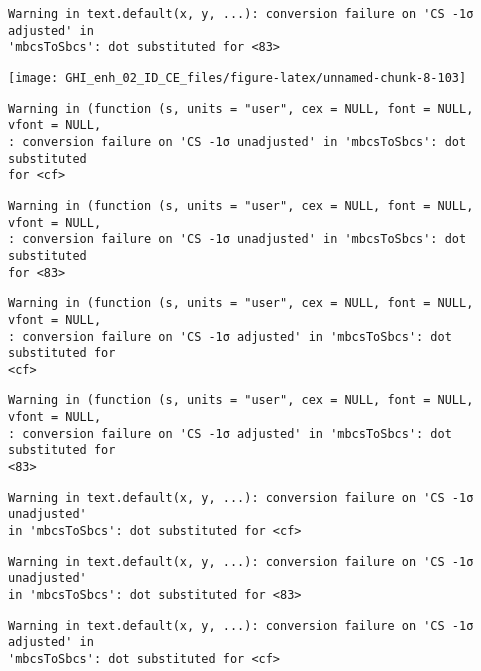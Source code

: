 \documentclass[
  10pt,
  a4paper,oneside]{article}
\begin{document}
\begin{verbatim}
Warning in text.default(x, y, ...): conversion failure on 'CS -1σ adjusted' in
'mbcsToSbcs': dot substituted for <83>
\end{verbatim}

\begin{center}\texttt{[image: GHI\_enh\_02\_ID\_CE\_files/figure-latex/unnamed-chunk-8-103]} \end{center}

\begin{verbatim}
Warning in (function (s, units = "user", cex = NULL, font = NULL, vfont = NULL,
: conversion failure on 'CS -1σ unadjusted' in 'mbcsToSbcs': dot substituted
for <cf>
\end{verbatim}

\begin{verbatim}
Warning in (function (s, units = "user", cex = NULL, font = NULL, vfont = NULL,
: conversion failure on 'CS -1σ unadjusted' in 'mbcsToSbcs': dot substituted
for <83>
\end{verbatim}

\begin{verbatim}
Warning in (function (s, units = "user", cex = NULL, font = NULL, vfont = NULL,
: conversion failure on 'CS -1σ adjusted' in 'mbcsToSbcs': dot substituted for
<cf>
\end{verbatim}

\begin{verbatim}
Warning in (function (s, units = "user", cex = NULL, font = NULL, vfont = NULL,
: conversion failure on 'CS -1σ adjusted' in 'mbcsToSbcs': dot substituted for
<83>
\end{verbatim}

\begin{verbatim}
Warning in text.default(x, y, ...): conversion failure on 'CS -1σ unadjusted'
in 'mbcsToSbcs': dot substituted for <cf>
\end{verbatim}

\begin{verbatim}
Warning in text.default(x, y, ...): conversion failure on 'CS -1σ unadjusted'
in 'mbcsToSbcs': dot substituted for <83>
\end{verbatim}

\begin{verbatim}
Warning in text.default(x, y, ...): conversion failure on 'CS -1σ adjusted' in
'mbcsToSbcs': dot substituted for <cf>
\end{verbatim}
\end{document}

